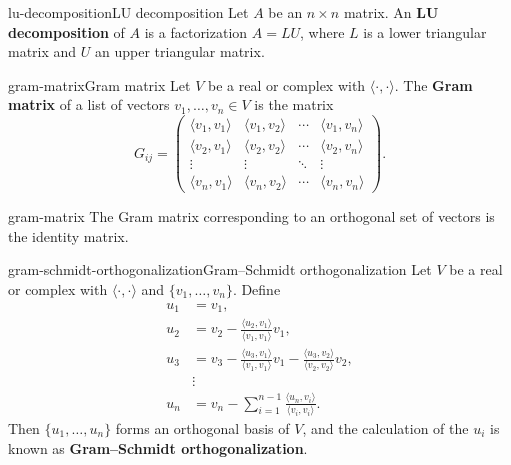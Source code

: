 \begin{topic}{lu-decomposition}{LU decomposition}
    Let $A$ be an $n \times n$ matrix. An \textbf{LU decomposition} of $A$ is a factorization $A = LU$, where $L$ is a lower triangular matrix and $U$ an upper triangular matrix.
\end{topic}

\begin{topic}{gram-matrix}{Gram matrix}
    Let $V$ be a real or complex  with  $\langle \cdot, \cdot \rangle$. The \textbf{Gram matrix} of a list of vectors $v_1, \ldots, v_n \in V$ is the  matrix
    \[ G_{ij} = \begin{pmatrix}
        \langle v_1, v_1 \rangle & \langle v_1, v_2 \rangle & \cdots & \langle v_1, v_n \rangle \\
        \langle v_2, v_1 \rangle & \langle v_2, v_2 \rangle & \cdots & \langle v_2, v_n \rangle \\
        \vdots & \vdots & \ddots & \vdots \\
        \langle v_n, v_1 \rangle & \langle v_n, v_2 \rangle & \cdots & \langle v_n, v_n \rangle
    \end{pmatrix} . \]
\end{topic}

\begin{example}{gram-matrix}
    The Gram matrix corresponding to an orthogonal set of vectors is the identity matrix.
\end{example}

\begin{topic}{gram-schmidt-orthogonalization}{Gram--Schmidt orthogonalization}
    Let $V$ be a real or complex  with  $\langle \cdot, \cdot \rangle$ and  $\{ v_1, \ldots, v_n \}$. Define
    \[ \begin{aligned}
        u_1 &= v_1, \\
        u_2 &= v_2 - \frac{\langle u_2, v_1 \rangle}{\langle v_1, v_1 \rangle} v_1, \\
        u_3 &= v_3 - \frac{\langle u_3, v_1 \rangle}{\langle v_1, v_1 \rangle} v_1 - \frac{\langle u_3, v_2 \rangle}{\langle v_2, v_2 \rangle} v_2, \\
        & \vdots \\
        u_n &= v_n - \sum_{i = 1}^{n - 1} \frac{\langle u_n, v_i \rangle}{\langle v_i, v_i \rangle} .
    \end{aligned} \]
    Then $\{ u_1, \ldots, u_n \}$ forms an orthogonal basis of $V$, and the calculation of the $u_i$ is known as \textbf{Gram--Schmidt orthogonalization}.
\end{topic}

